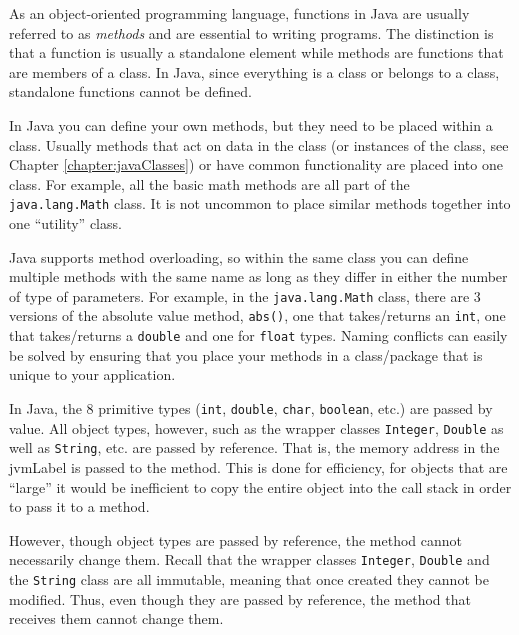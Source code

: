 

As an object-oriented programming language, functions in
Java are usually referred to as \emph{methods} and are 
essential to writing programs.  The distinction is that a 
function is usually a standalone element while methods
are functions that are members of a class.  In Java, since
everything is a class or belongs to a class, standalone
functions cannot be defined.

In Java you can define your own methods, but they
need to be placed within a class.  Usually methods that
act on data in the class (or instances of the class, see
Chapter \ref{chapter:javaClasses}) or have common
functionality are placed into one class.  For example, all
the basic math methods are all part of the 
\texttt{java.lang.Math} class.  It is not uncommon
to place similar methods together into one ``utility'' class.

Java supports method overloading, so within the same 
class you can define multiple methods with the same name
as long as they differ in either the number of type of 
parameters.  For example, in the \texttt{java.lang.Math}
class, there are 3 versions of the absolute value method,
\texttt{abs()}, one that takes/returns an 
\texttt{int}, one that takes/returns a \texttt{double}
and one for \texttt{float} types.  Naming conflicts
can easily be solved by ensuring that you place your 
methods in a class/package that is unique to your application.

In Java, the 8 primitive types (\texttt{int}, \texttt{double},
\texttt{char}, \texttt{boolean}, etc.) are 
passed by value.  All object types, however, such as the 
wrapper classes \texttt{Integer}, \texttt{Double}
as well as \texttt{String}, etc. are passed by 
reference.  That is, the memory address in the \gls{jvmLabel}
is passed to the method.  This is done for efficiency, for 
objects that are ``large'' it would be inefficient to copy the
entire object into the call stack in order to pass it to a
method.  

However, though object types are passed by reference, the
method cannot necessarily change them.  Recall that the wrapper
classes \texttt{Integer}, \texttt{Double} and
the \texttt{String} class are all \gls{immutable}, meaning
that once created they cannot be modified.  Thus, even though
they are passed by reference, the method that receives them
cannot change them.

